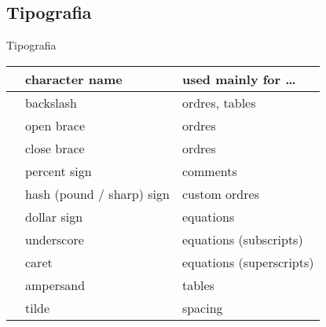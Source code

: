 \subsection{Tipografia}
\begin{frame}{Tipografia}
\begin{tabular}{lll}
& character name & used mainly for \dots \\\hline
\bftt{\bs} & backslash                 & ordres, tables \\
\bftt{\{}  & open brace                & ordres \\
\bftt{\}}  & close brace               & ordres \\
\bftt{\%}  & percent sign              & comments \\
\bftt{\#}  & hash (pound / sharp) sign & custom ordres \\
\bftt{\$}  & dollar sign               & equations \\
\bftt{\_}  & underscore                & equations (subscripts) \\
\bftt{\^}  & caret                     & equations (superscripts) \\
\bftt{\&}  & ampersand                 & tables \\
\bftt{\~}  & tilde                     & spacing \\
\end{tabular}
\end{frame}


